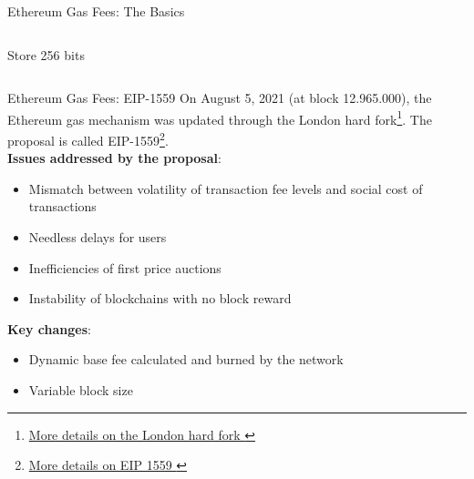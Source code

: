 \documentclass[]{beamer}
\begin{document}
\begin{frame}{Ethereum Gas Fees: The Basics}
\begin{itemize}
\begin{columns}
{\begin{column}{0.25\textwidth}
\begin{samplecode}{Store 256 bits}
					\end{samplecode}	
				\end{column}
				}
				\begin{column}{0.02\textwidth} %
				\end{column}
			\end{columns}
	\end{itemize} 
\end{frame}

\begin{frame}{Ethereum Gas Fees: EIP-1559}
	On August 5, 2021 (at block 12.965.000), the Ethereum gas mechanism was updated through the London hard fork\footnote{\href{https://ethereum.org/en/history/\#london}{More details on the London hard fork \link}}. The proposal is called EIP-1559\footnote{\href{https://eips.ethereum.org/EIPS/eip-1559}{More details on EIP 1559 \link}}.\\
	\vspace{0.2cm}
	\textbf{Issues addressed by the proposal}:
	\begin{itemize}
		\item Mismatch between volatility of transaction fee levels and social cost of transactions
		\item Needless delays for users
		\item Inefficiencies of first price auctions
		\item Instability of blockchains with no block reward
	\end{itemize}
	\textbf{Key changes}:
	\begin{itemize}
		\item Dynamic base fee calculated and burned by the network
		\item Variable block size
	\end{itemize}
\end{frame}
\end{document}
